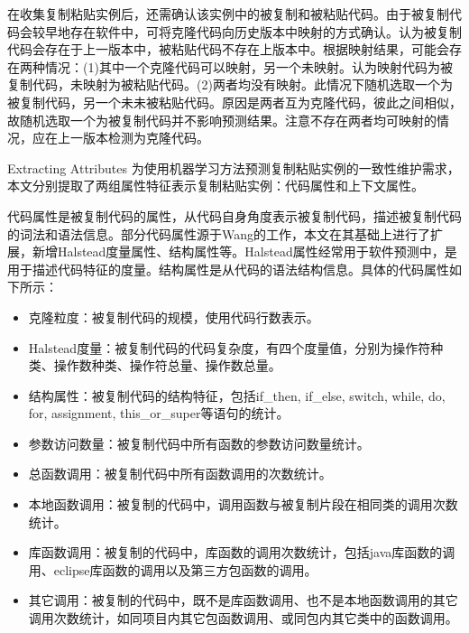 在收集复制粘贴实例后，还需确认该实例中的被复制和被粘贴代码。由于被复制代码会较早地存在软件中，可将克隆代码向历史版本中映射的方式确认。认为被复制代码会存在于上一版本中，被粘贴代码不存在上版本中。根据映射结果，可能会存在两种情况：(1)其中一个克隆代码可以映射，另一个未映射。认为映射代码为被复制代码，未映射为被粘贴代码。(2)两者均没有映射。此情况下随机选取一个为被复制代码，另一个未未被粘贴代码。原因是两者互为克隆代码，彼此之间相似，故随机选取一个为被复制代码并不影响预测结果。注意不存在两者均可映射的情况，应在上一版本检测为克隆代码。

{Extracting Attributes}
为使用机器学习方法预测复制粘贴实例的一致性维护需求，本文分别提取了两组属性特征表示复制粘贴实例：代码属性和上下文属性。

代码属性是被复制代码的属性，从代码自身角度表示被复制代码，描述被复制代码的词法和语法信息。部分代码属性源于Wang的工作，本文在其基础上进行了扩展，新增Halstead度量属性、结构属性等。Halstead属性经常用于软件预测中，是用于描述代码特征的度量。结构属性是从代码的语法结构信息。具体的代码属性如下所示：
\begin{itemize}
\item 克隆粒度：被复制代码的规模，使用代码行数表示。
\item Halstead度量：被复制代码的代码复杂度，有四个度量值，分别为操作符种类、操作数种类、操作符总量、操作数总量。
\item  结构属性：被复制代码的结构特征，包括if\_then, if\_else, switch, while, do, for, assignment, this\_or\_super等语句的统计。
\item  参数访问数量：被复制代码中所有函数的参数访问数量统计。
\item  总函数调用：被复制代码中所有函数调用的次数统计。
\item  本地函数调用：被复制的代码中，调用函数与被复制片段在相同类的调用次数统计。
\item  库函数调用：被复制的代码中，库函数的调用次数统计，包括java库函数的调用、eclipse库函数的调用以及第三方包函数的调用。
\item  其它调用：被复制的代码中，既不是库函数调用、也不是本地函数调用的其它调用次数统计，如同项目内其它包函数调用、或同包内其它类中的函数调用。
\end{itemize}

